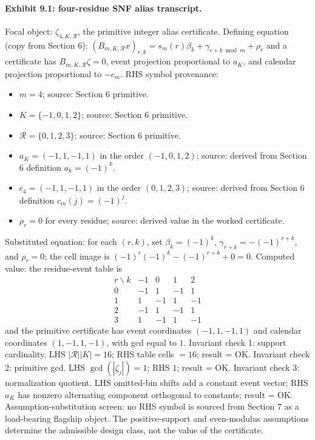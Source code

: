 \documentclass[11pt]{article}
\newcommand{\calR}{\mathcal{R}}
\theoremstyle{definition}
\theoremstyle{plain}
\theoremstyle{remark}
\begin{document}
\paragraph{Exhibit 9.1: four-residue SNF alias transcript.}
Focal object: $\zeta_{4,K,\calR}$, the primitive integer alias certificate.
Defining equation (copy from Section 6): $(B_{m,K,\calR}x)_{r,k}=s_m(r)\beta_k+\gamma_{r+k\bmod m}+\rho_r$ and a certificate has $B_{m,K,\calR}\zeta=0$, event projection proportional to $a_K$, and calendar projection proportional to $-c_m$.
RHS symbol provenance:
\begin{itemize}[leftmargin=*]
\item $m=4$; source: Section 6 primitive.
\item $K=\{-1,0,1,2\}$; source: Section 6 primitive.
\item $\calR=\{0,1,2,3\}$; source: Section 6 primitive.
\item $a_K=(-1,1,-1,1)$ in the order $(-1,0,1,2)$; source: derived from Section 6 definition $a_k=(-1)^k$.
\item $c_4=(-1,1,-1,1)$ in the order $(0,1,2,3)$; source: derived from Section 6 definition $c_m(j)=(-1)^j$.
\item $\rho_r=0$ for every residue; source: derived value in the worked certificate.
\end{itemize}
Substituted equation: for each $(r,k)$, set $\beta_k=(-1)^k$, $\gamma_{r+k}=-(-1)^{r+k}$, and $\rho_r=0$; the cell image is $(-1)^r(-1)^k-(-1)^{r+k}+0=0$.
Computed value: the residue-event table is
\[
\begin{array}{c|rrrr}
r\backslash k & -1 & 0 & 1 & 2\\
\hline
0&-1&1&-1&1\\
1&1&-1&1&-1\\
2&-1&1&-1&1\\
3&1&-1&1&-1
\end{array}
\]
and the primitive certificate has event coordinates $(-1,1,-1,1)$ and calendar coordinates $(1,-1,1,-1)$, with gcd equal to $1$.
Invariant check 1: support cardinality. LHS $|\calR||K|=16$; RHS table cells $=16$; result = OK.
Invariant check 2: primitive gcd. LHS $\gcd(|\zeta_j|)=1$; RHS $1$; result = OK.
Invariant check 3: normalization quotient. LHS omitted-bin shifts add a constant event vector; RHS $a_K$ has nonzero alternating component orthogonal to constants; result = OK.
Assumption-substitution screen: no RHS symbol is sourced from Section 7 as a load-bearing flagship object. The positive-support and even-modulus assumptions determine the admissible design class, not the value of the certificate.
\end{document}
